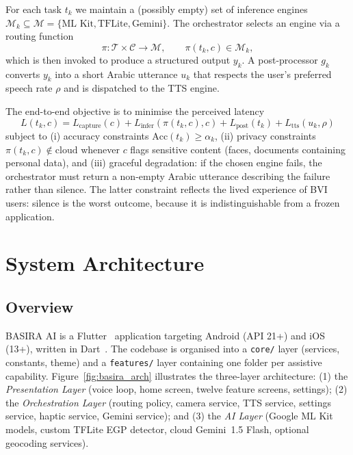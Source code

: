\documentclass[11pt,a4paper]{article}
\begin{document}
For each task $t_k$ we maintain a (possibly empty) set of inference engines
$\mathcal{M}_k \subseteq \mathcal{M} = \{\text{ML Kit}, \text{TFLite},
\text{Gemini}\}$. The orchestrator selects an engine via a routing function
\[
\pi : \mathcal{T} \times \mathcal{C} \rightarrow \mathcal{M}, \qquad
\pi(t_k, c) \in \mathcal{M}_k,
\]
which is then invoked to produce a structured output $y_k$. A post-processor
$g_k$ converts $y_k$ into a short Arabic utterance $u_k$ that respects the
user's preferred speech rate $\rho$ and is dispatched to the TTS engine.

The end-to-end objective is to minimise the perceived latency
\[
L(t_k, c) = L_{\text{capture}}(c) + L_{\text{infer}}(\pi(t_k, c), c) +
L_{\text{post}}(t_k) + L_{\text{tts}}(u_k, \rho)
\]
subject to (i) accuracy constraints $\text{Acc}(t_k) \geq \alpha_k$, (ii)
privacy constraints $\pi(t_k, c) \notin \text{cloud}$ whenever $c$ flags
sensitive content (faces, documents containing personal data), and (iii)
graceful degradation: if the chosen engine fails, the orchestrator must
return a non-empty Arabic utterance describing the failure rather than
silence. The latter constraint reflects the lived experience of BVI users:
silence is the worst outcome, because it is indistinguishable from a frozen
application.

\section{System Architecture}
\label{sec:architecture}

\subsection{Overview}

BASIRA AI is a Flutter~\cite{flutter_framework} application targeting Android
(API 21+) and iOS
(13+), written in Dart~\cite{dart_language}. The codebase is organised into a
\texttt{core/} layer (services,
constants, theme) and a \texttt{features/} layer containing one folder per
assistive capability. Figure~\ref{fig:basira_arch} illustrates the
three-layer architecture: (1) the \emph{Presentation Layer} (voice loop,
home screen, twelve feature screens, settings); (2) the \emph{Orchestration
Layer} (routing policy, camera service, TTS service, settings service,
haptic service, Gemini service); and (3) the \emph{AI Layer} (Google ML Kit
models, custom TFLite EGP detector, cloud Gemini~1.5 Flash, optional
geocoding services).
\end{document}
